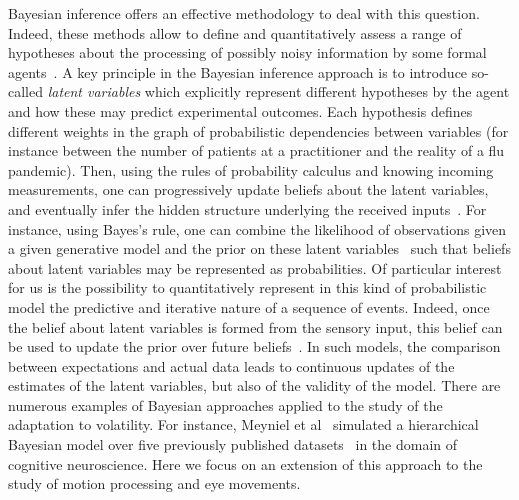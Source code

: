 \documentclass[10pt,letterpaper]{article}
\newcommand{\citep}[1]{\cite{#1}}
\newcommand{\citet}[1]{\cite{#1}}
\newcommand{\AM}[1]{\textbf{\textcolor{blue}{[AM: #1]}}}
\begin{document}
Bayesian inference offers an effective methodology
to deal with this question.
Indeed, these methods allow to define and quantitatively assess
a range of hypotheses about the processing of possibly noisy information by some formal agents~\citep{Deneve1999, Diaconescu2014, Daunizeau10a}.
A key principle in the Bayesian inference approach is
to introduce so-called \emph{latent variables}
which explicitly represent different hypotheses by the agent and how these may predict experimental outcomes.
Each hypothesis defines different weights in the graph of probabilistic dependencies between variables 
(for instance between the number of patients at a practitioner and the reality of a flu pandemic).
Then, using the rules of probability calculus and knowing incoming measurements,
one can progressively update beliefs about the latent variables,
and eventually infer the hidden structure underlying the received inputs~\citep{Hoyer2003, Ma2014}.
For instance, using Bayes's rule, one can combine
the likelihood of observations given a given generative model and
the prior on these latent variables~\citep{Jaynes2014}
such that beliefs about latent variables
may be represented as probabilities.
Of particular interest for us is the possibility to
quantitatively represent in this kind of probabilistic model
the predictive and iterative nature of a sequence of events.
Indeed, once the belief about latent variables
is formed from the sensory input,
this belief can be used to update
the prior over future beliefs~\citep{Montagnini2007}.
In such models, the comparison between expectations and actual data leads to
continuous updates of the estimates of the latent variables,
but also of the validity of the model.
There are numerous examples of Bayesian approaches
applied to the study of the adaptation to volatility.
For instance, Meyniel et al~\citet{Meyniel16} simulated a hierarchical Bayesian model
over five previously published datasets~\citep{Squires1976, Huettel2002, Kolossa2013, Cho2002, Falk1997}
in the domain of cognitive neuroscience.
Here we focus on an extension of this approach to the study of motion processing and eye movements.
\end{document}
